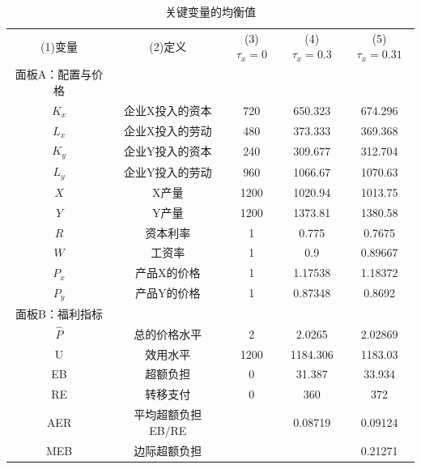 \documentclass[cn,10pt,math=newtx,citestyle=gb7714-2015,bibstyle=gb7714-2015]{elegantbook}
\begin{document}
	\begin{table}[!htbp]
		\centering
		\caption{关键变量的均衡值}
		\begin{tabular}{ccccc}
			\hline
			(1)变量& (2)定义 &(3)$\tau_x=0$  & (4)$\tau_x=0.3$ & (5)$\tau_x=0.31$ \\
			
			面板A：配置与价格  \\
			
			$K_x$	& 企业X投入的资本 & 720 & 650.323 & 674.296 \\
			
			$L_x$	& 企业X投入的劳动 & 480 &373.333  & 369.368 \\
			
			$K_y$	&企业Y投入的资本  & 240 & 309.677 & 312.704 \\
			
			$L_y$	&企业Y投入的劳动  & 960 &1066.67  &1070.63  \\
			
			$X$	&X产量  & 1200 & 1020.94 & 1013.75 \\
			
			$Y$	&Y产量  &1200  &1373.81  &1380.58  \\
			
			$R$	& 资本利率 & 1 & 0.775 & 0.7675 \\
			
			$W$ &工资率  & 1 & 0.9 & 0.89667 \\
			
			$P_x$	&产品X的价格  & 1 & 1.17538 & 1.18372 \\
			
			$P_y$	& 产品Y的价格 & 1 & 0.87348 & 0.8692 \\
			
			面板B：福利指标  \\
			
			$\hat{P}$	& 总的价格水平 & 2 &2.0265  & 2.02869 \\
			
			U	& 效用水平 & 1200 & 1184.306 & 1183.03 \\
			
			EB	& 超额负担 & 0 & 31.387 & 33.934 \\
			
			RE	& 转移支付 & 0 & 360 & 372 \\
			
			AER	&平均超额负担EB/RE  &  & 0.08719 & 0.09124 \\
			
			MEB	&边际超额负担  &  &  & 0.21271 \\
			\hline
		\end{tabular}
	\end{table}
	
\end{document}
